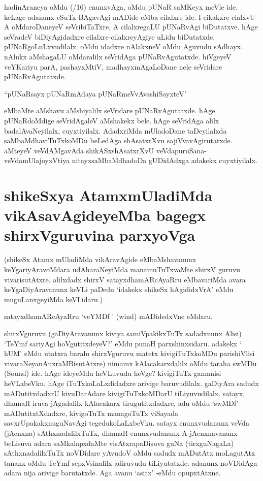 hadinAraneya oMdu {(/16)} enunxvAga, oMdu pUNaR saMKeyx meVle ide. keLage adanunx eSuTx BAgavAgi mADide eMba cilalxre ide. I cikakxre elalxvU A oMdaroDaneyeV seVribiTaTxre, A cilalxregaLU pUNaRvAgi biDutatxve. hAge seVradeV biDiyAgidadxre cilalxre-cilalxreyAgiye uLidu biDutatxde, pUNaRgoLuLxvudilalx. oMdu idadxre nAlakxneV oMdu Aguvudu sAdhayx. nAlukx aMshagaLU oMdaralilx seVridAga pUNaRvAgutatxde. hiVgeyeV veYKariyu parA, pashayxMtiV, madhayxmAgaLoDane nele seVridare pUNaRvAgutatxde.
\begin{shloka}
``pUNaRsayx pUNaRmAdaya pUNaRmeVvAvashiSayxteV"\label{23}
\end{shloka}

eMbaMte aMshavu aMshiyalilx seVridare pUNaRvAgutatxde. hAge pUNaRdoMdige seVridAgaleV aMshakekx bele. hAge seVridAga alilx badalAvaNeyilalx, cuyxtiyilalx. AdadxriMda  mUladoDane taDeyilalxda saMbaMdhaviTuTxkoMDu beLedAga shAsatxrXvu sajiVvavAgirutatxde. aMteyeV veVdAMgavAda shikASxshAsatxrXvU veVdapuruSana-veVdamUlajoyxVtiya nitayxsaMbaMdhadoDa gUDidAdxga  adakekx  cuyxtiyilalx.

\section*{shikeSxya AtamxmUladiMda vikAsavAgideyeMba bagegx shirxVguruvina parxyoVga}

(shikeSx Atamx mUladiMda vikAravAgide eMbaMshavanunx keYgariyAravoMdara udAharaNeyiMda manamuTuTxvaMte shirxV guruvu vivarisutAtxre. alilxdadx shirxV satayxdhamARcAyaRru  eMbavariMda avara keYgaDiyAravanunx keVLi paDedu `idakekx shikeSx hAgididxVrA' eMdu muguLanxgeyiMda keVLidaru.)

satayxdhamARcAyaRru `veYMDf ' {(\eng wind)} mADidedxVne eMdaru.

shirxVguruvu (gaDiyAravanunx kiviya samiVpakikxTuTx sadadxnunx  Alisi) `TeYmf sariyAgi hoVgutitxdeyeV?' eMdu punaH parxshinxsidaru. adakekx  ` hUM' eMdu utatxra baralu shirxVguruvu matetx kivigiTuTxkoMDu parishiVlisi vivaraNeyanAnxraMBisutAtxre) nimamx kAlacakarxdalilx oMdu taraha swMDu {(\eng Sound)} ide. hAge ideyeMdu heVLuvudu heVge? kivigiTuTx gamanisi heVLabeVku. hAge iTuTxkoLaLxdidadxre arivige baruvudilalx. gaDiyAra sadudx mADutitxdadxrU kivuDarAdare kivigiTuTxkoMDarU tiLiyuvudilalx. satayx, dhamaR iruva jAgadalilx kAlacakarx tirugutitxdadxre, adu oMdu `swMDf' mADutitxtXdadxre, kivigoTuTx managoTuTx viSayada savxrUpakakxnuguNavAgi tegedukoLaLxbeVku. satayx enunxvudanunx veVda (jAcnxna) sAthxnadalilxTuTx, dhamaR enunxvudanunx A jAcnxnavanunx beLisuva adara saMkalapxdaMte visAtxrapaDisuva guNa (tirxguNagaLa) sAthxnadalilxTuTx noVDidare yAvudoV oMdu sadudx mADutAtx moLagutAtx tananx oMdu TeYmf-sepxVsinalilx adiruvudu tiLiyutatxde. adanunx noVDidAga adara nija arivige barutatxde. Aga avanu `asitx' -eMdu opupxtAtxne.

